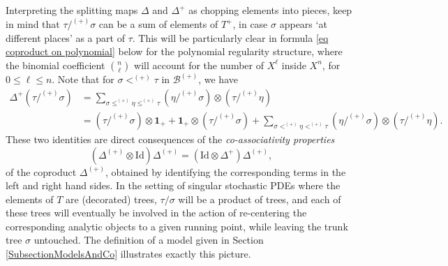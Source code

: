 \documentclass[10pt, reqno]{amsart}
\numberwithin{subsection}{section}
\numberwithin{subsubsection}{subsection}
\numberwithin{equation}{section} %
\theoremstyle{mystyle}
\theoremstyle{mystyle2}
\theoremstyle{mystyle3}
\newcommand{\unit}{\mathbf{1}}
\newcommand{\mcB}{\mathcal{B}}
\begin{document}
\medskip

Interpreting the splitting maps $\Delta$ and $\Delta^+$ as chopping elements into pieces, keep in mind that $\tau/^{(+)}\sigma$ can be a sum of elements of $T^+$, in case $\sigma$ appears `at different places' as a part of $\tau$. This will be particularly clear in formula \eqref{eq coproduct on polynomial} below for the polynomial regularity structure, where 
the binomial coefficient $\binom{n}{\ell}$ will account for the number of 
$X^\ell$ inside $X^n$, for $0\leq \ell\leq n$. Note that for $\sigma<^{(+)}\tau$ in $\mcB^{(+)}$, we have
\begin{equation}
\label{EqCoprodQuotient+}
\begin{split}
\Delta^+(\tau/^{(+)}\sigma) &= \sum_{\sigma \leq^{(+)} \eta \leq^{(+)} \tau}(\eta/^{(+)}\sigma)\otimes(\tau/^{(+)}\eta)   \\
                                     &= (\tau/^{(+)}\sigma)\otimes\unit_+ + \unit_+\otimes(\tau/^{(+)}\sigma) + \sum_{\sigma <^{(+)} \eta <^{(+)} \tau}(\eta/^{(+)}\sigma)\otimes(\tau/^{(+)}\eta).
\end{split}
\end{equation}
These two identities are direct consequences of the \textit{co-associativity properties} 
$$
(\Delta^{(+)}\otimes \textrm{Id})\Delta^{(+)} = ( \textrm{Id}\otimes \Delta^+)\Delta^{(+)},
$$
of the coproduct $\Delta^{(+)}$, obtained by identifying the corresponding terms in the left and right hand sides. In the setting of singular stochastic PDEs where the elements of $T$ are (decorated) trees, $\tau/\sigma$ will be a product of trees, and each of these trees will eventually be involved in the action of re-centering the corresponding analytic objects 
to a given running point, while leaving the trunk tree $\sigma$ untouched. The definition of a model given in Section \ref{SubsectionModelsAndCo} illustrates exactly this picture. 

\medskip
\end{document}
